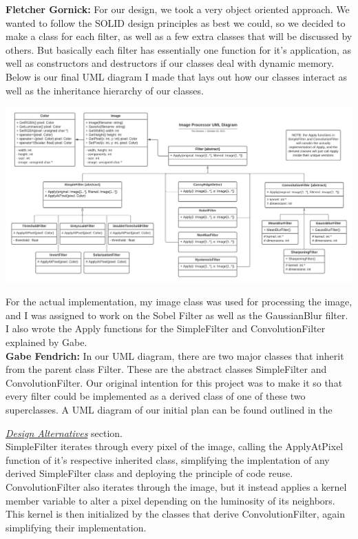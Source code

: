 \textbf{Fletcher Gornick:}
For our design, we took a very object oriented approach.  We wanted to follow the SOLID design 
principles as best we could, so we decided to make a class for each filter, as well as a few extra 
classes that will be discussed by others.  But basically each filter has essentially one function 
for it's application, as well as constructors and destructors if our classes deal with dynamic 
memory.  Below is our final UML diagram I made that lays out how our classes interact as well as the 
inheritance hierarchy of our classes.

\includegraphics[width=\textwidth]{new.png}

For the actual implementation, my image class was used for processing the image, and I was assigned 
to work on the Sobel Filter as well as the GaussianBlur filter.  I also wrote the Apply functions 
for the SimpleFilter and ConvolutionFilter explained by Gabe. \\

\textbf{Gabe Fendrich:}
In our UML diagram, there are two major classes that inherit from the parent class Filter.  These are 
the abstract classes SimpleFilter and ConvolutionFilter.  Our original intention for this project 
was to make it so that every filter could be implemented as a derived class of one of these two superclasses.  A UML diagram of our initial plan can be   found outlined in the
 
\hyperref[sec:alt]{\textit{Design Alternatives}} section. \\

SimpleFilter iterates through every pixel of the image, calling the ApplyAtPixel function 
of it's respective inherited class, simplifying the implentation of any derived SimpleFilter class and deploying the principle of code reuse.  ConvolutionFilter also iterates through the image, but it instead 
applies a kernel member variable to alter a pixel depending on the luminosity of its neighbors.  This kernel is then 
initialized by the classes that derive ConvolutionFilter, again simplifying their implementation. \\

